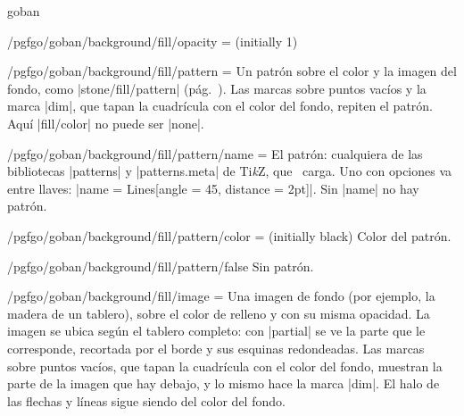 \begin{environment}{{goban}}
\begin{key}{/pgfgo/goban/background/fill/opacity = (initially 1)}
\begin{codeexample}[]
			\begin{goban}[resume = a,
				background = {fill = {color = orange!40}, fill = {opacity = 0.5}}]
			\end{goban}
		\end{codeexample}
		
	\end{key}
	
	\begin{key}{/pgfgo/goban/background/fill/pattern =}
		Un patrón sobre el color y la imagen del fondo, como |stone/fill/pattern| (pág.~\pageref{sec:piedras}). Las marcas sobre puntos vacíos y la marca |dim|, que tapan la cuadrícula con el color del fondo, repiten el patrón. Aquí |fill/color| no puede ser |none|.

		\begin{codeexample}[]

			\begin{goban}[background = {fill = {
					pattern = {name = dots, color = gray}}}]
			\end{goban}
		\end{codeexample}
	\end{key}

	\begin{key}{/pgfgo/goban/background/fill/pattern/name = }
		El patrón: cualquiera de las bibliotecas |patterns| y |patterns.meta| de Ti\emph{k}Z, que \pgfgoname\ carga. Uno con opciones va entre llaves: |name = {Lines[angle = 45, distance = 2pt]}|. Sin |name| no hay patrón.
	\end{key}

	\begin{key}{/pgfgo/goban/background/fill/pattern/color =  (initially black)}
		Color del patrón.
	\end{key}

	\begin{key}{/pgfgo/goban/background/fill/pattern/false}
		Sin patrón.
	\end{key}

	\begin{key}{/pgfgo/goban/background/fill/image =}
		Una imagen de fondo (por ejemplo, la madera de un tablero), sobre el color de relleno y con su misma opacidad. La imagen se ubica según el tablero completo: con |partial| se ve la parte que le corresponde, recortada por el borde y sus esquinas redondeadas. Las marcas sobre puntos vacíos, que tapan la cuadrícula con el color del fondo, muestran la parte de la imagen que hay debajo, y lo mismo hace la marca |dim|. El halo de las flechas y líneas sigue siendo del color del fondo.


\end{key}
\end{environment}
